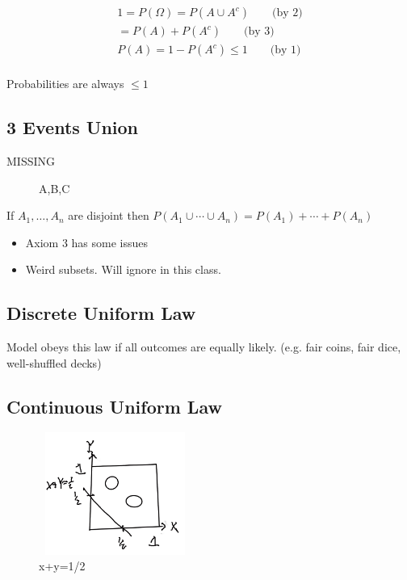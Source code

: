 \begin{align*}
1 = P(\Omega) = P(A \cup A^c) \qquad \text{(by 2)}\\
= P(A) + P(A^c)  \qquad \text{(by 3)}\\
P(A) = 1 - P(A^c) \le 1  \qquad \text{(by 1)}\\
\end{align*}

Probabilities are always $\le 1$

\subsection{3 Events Union}

MISSING

\begin{figure}[!ht]
\centering
{}
\caption{A,B,C} \label{fig:M3}
\end{figure}

If $A_1,\ldots, A_n$ are disjoint then $P(A_1 \cup \cdots \cup A_n) = P(A_1) + \cdots + P(A_n)$

\begin{itemize}
    \item Axiom 3 has some issues 
    \item Weird subsets.  Will ignore in this class.
\end{itemize}

\subsection{Discrete Uniform Law}

Model obeys this law if all outcomes are equally likely. (e.g. fair coins, fair dice, well-shuffled decks)

\subsection{Continuous Uniform Law}

\begin{figure}[!ht]
\centering
\includegraphics[width=5cm, height=4cm]{images/L01/cont_unif_law.jpeg}
\caption{x+y=1/2}
\end{figure}

